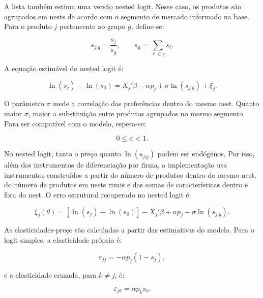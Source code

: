 \documentclass[12pt,a4paper]{article}
\begin{document}
A lista também estima uma versão nested logit. Nesse caso, os produtos são agrupados em nests de acordo com o segmento de mercado informado na base. Para o produto \(j\) pertencente ao grupo \(g\), define-se:

\begin{equation}
    s_{j|g}
    =
    \frac{s_j}{s_g},
    \qquad
    s_g
    =
    \sum_{\ell\in g}s_{\ell}.
    \label{eq:share_within_nest}
\end{equation}

A equação estimável do nested logit é:

\begin{equation}
    \ln(s_j)
    -
    \ln(s_0)
    =
    X_j'\beta
    -
    \alpha p_j
    +
    \sigma\ln(s_{j|g})
    +
    \xi_j.
    \label{eq:nested_logit}
\end{equation}

O parâmetro \(\sigma\) mede a correlação das preferências dentro do mesmo nest. Quanto maior \(\sigma\), maior a substituição entre produtos agrupados no mesmo segmento. Para ser compatível com o modelo, espera-se:

\begin{equation}
    0\leq \sigma < 1.
    \label{eq:intervalo_sigma}
\end{equation}

No nested logit, tanto o preço quanto \(\ln(s_{j|g})\) podem ser endógenos. Por isso, além dos instrumentos de diferenciação por firma, a implementação usa instrumentos construídos a partir do número de produtos dentro do mesmo nest, do número de produtos em nests rivais e das somas de características dentro e fora do nest. O erro estrutural recuperado no nested logit é:

\begin{equation}
    \xi_j(\theta)
    =
    \left[\ln(s_j)-\ln(s_0)\right]
    -
    X_j'\beta
    +
    \alpha p_j
    -
    \sigma\ln(s_{j|g}).
    \label{eq:erro_nested}
\end{equation}

As elasticidades-preço são calculadas a partir das estimativas do modelo. Para o logit simples, a elasticidade própria é:

\begin{equation}
    \varepsilon_{jj}
    =
    -\alpha p_j(1-s_j),
    \label{eq:elasticidade_propria}
\end{equation}

e a elasticidade cruzada, para \(k\neq j\), é:

\begin{equation}
    \varepsilon_{jk}
    =
    \alpha p_k s_k.
    \label{eq:elasticidade_cruzada}
\end{equation}
\end{document}
